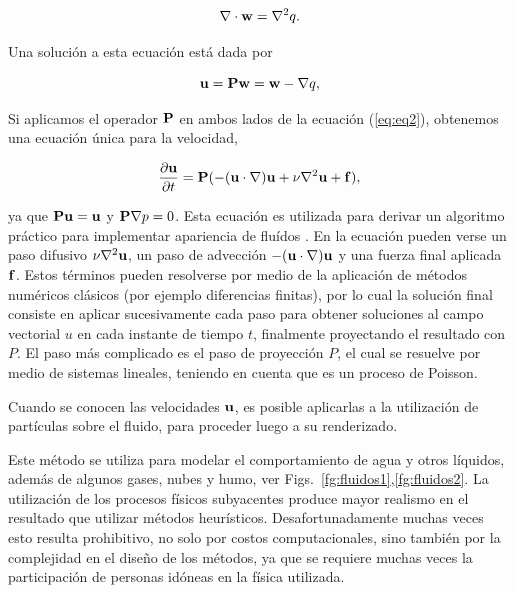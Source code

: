 \begin{equation}
\label{eq:eq4}
\nabla\cdot\bold{w} = \nabla^{2} q.
\end{equation}

Una solución a esta ecuación está dada por

\begin{equation}
\label{eq:eq5}
\bold{u} = \bold{P}\bold{w} = \bold{w} - \nabla q,
\end{equation}

Si aplicamos el operador $\bold{P}$ en ambos lados de la ecuación (\ref{eq:eq2}), obtenemos una ecuación única para la velocidad,

\begin{equation}
\frac{\partial \bold{u} }{\partial t} = \bold{P} (- (\bold{u} \cdot \nabla) \bold{u} + \nu \nabla^{2} \bold{u} + \bold{f}) \label{eq:eq6},
\end{equation}

ya que $\bold{P}\bold{u} = \bold{u}$ y $\bold{P}\nabla p = 0$.
Esta ecuación es utilizada para derivar un algoritmo práctico para implementar apariencia de fluídos \cite{Stam1999}.
En la ecuación pueden verse un paso difusivo $\nu \nabla^{2} \bold{u}$, un paso de advección $- (\bold{u} \cdot \nabla) \bold{u}$ y una fuerza final aplicada $\bold{f}$.
Estos términos pueden resolverse por medio de la aplicación de métodos numéricos clásicos (por ejemplo diferencias finitas), por lo cual la solución final consiste en aplicar sucesivamente cada paso para obtener soluciones al campo vectorial $u$ en cada instante de tiempo $t$, finalmente proyectando el resultado con $P$.
El paso más complicado es el paso de proyección $P$, el cual se resuelve por medio de sistemas lineales, teniendo en cuenta que es un proceso de Poisson.

Cuando se conocen las velocidades $\bold{u}$, es posible aplicarlas a la utilización de partículas sobre el fluido, para proceder luego a su renderizado.

Este método se utiliza para modelar el comportamiento de agua y otros líquidos, además de algunos gases, nubes y humo, ver Figs.~\ref{fg:fluidos1},\ref{fg:fluidos2}.
La utilización de los procesos físicos subyacentes produce mayor realismo en el resultado que utilizar métodos heurísticos.
Desafortunadamente muchas veces esto resulta prohibitivo, no solo por costos computacionales, sino también por la complejidad en el diseño de los métodos, ya que se requiere muchas veces la participación de personas idóneas en la física utilizada.


